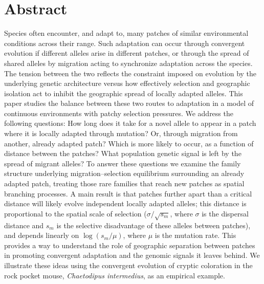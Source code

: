 \documentclass[10pt,letterpaper]{article}
\begin{document}
\section*{Abstract}
Species often encounter, and adapt to, 
many patches of similar environmental conditions across their range. 
Such adaptation can occur through convergent evolution 
if different alleles arise in different patches, 
or through the spread of shared alleles by migration
acting to synchronize adaptation across the species.
The tension between the two reflects 
the constraint imposed on evolution by the underlying genetic architecture 
versus how effectively selection and geographic isolation 
act to inhibit the geographic spread of locally adapted alleles.
This paper studies the balance between these two routes to adaptation 
in a model of continuous environments with patchy selection pressures.
We address the following questions: 
How long does it take for a novel allele to appear in a
patch where it is locally adapted through mutation?
Or, through migration from another, already adapted patch?
Which is more likely to occur, as a function of distance between the patches?
What population genetic signal is left by the spread of migrant alleles?
To answer these questions we examine the family structure 
underlying migration--selection equilibrium
surrounding an already adapted patch,
treating those rare families that reach new patches
as spatial branching processes.
A main result is that patches further apart than a critical distance will
likely evolve independent locally adapted alleles;
this distance is proportional to the spatial scale of selection
($\sigma/\sqrt{s_m}$, where $\sigma$ is the dispersal distance and
$s_m$ is the selective disadvantage of these alleles between patches),
and depends linearly on $\log(s_m/\mu)$, where $\mu$ is the mutation rate.
This provides a way to understand the role of geographic separation between patches 
in promoting convergent adaptation and the genomic signals it leaves behind.
We illustrate these ideas using the convergent evolution of cryptic coloration in the rock pocket mouse, \textit{Chaetodipus intermedius}, as an empirical example.


\end{document}

